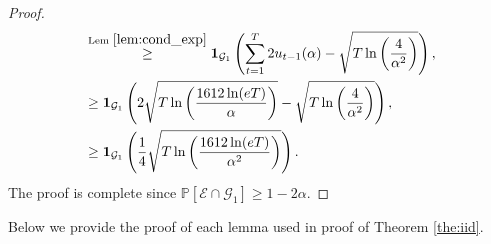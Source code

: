 \begin{proof}
\begin{align*}
             &\stackrel{\text{Lem } \ref{lem:cond_exp}}{\geq}  \mathbf{1}_{\mathcal{G}_1}\left( \sum_{t=1}^T 2u_{t-1}(\alpha) - \sqrt{T \ln \left( \frac{4}{\alpha^2} \right)}\right), \\
    &\stackrel{}{\geq}  \mathbf{1}_{\mathcal{G}_1}\left(2\sqrt{T \ln \left( \frac{1612 \ln(eT)}{\alpha} \right)} - \sqrt{T \ln \left( \frac{4}{\alpha^2} \right)}\right), \\
   &\geq  \mathbf{1}_{\mathcal{G}_1}\left(\frac{1}{4}\sqrt{T \ln \left( \frac{1612 \ln(eT)}{\alpha^2} \right)}\right).
\end{align*}
The proof is complete since $\mathbb{P}[\mathcal{E} \cap \mathcal{G}_1] \geq 1-2\alpha$. 
\end{proof}


Below we provide the proof of each lemma used in proof of Theorem \ref{the:iid}. 



